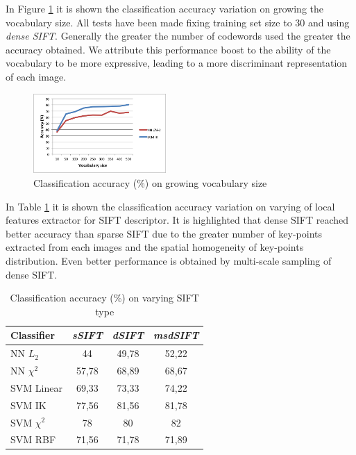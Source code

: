 In Figure \ref{fig:vocabulary} it is shown the classification accuracy variation on growing the vocabulary size. All tests have been made fixing training set size to 30 and using \emph{dense SIFT}. Generally the greater the number of codewords used the greater the accuracy obtained. We attribute this performance boost to the ability of the vocabulary to be more expressive, leading to a more discriminant representation of each image.

\begin{figure}[h]
\begin{center}
\includegraphics[width=0.45\textwidth]{images/vocabulary.png}
\end{center}
  \caption{Classification accuracy (\%) on growing vocabulary size}
\label{fig:vocabulary}
\end{figure}

In Table \ref{tab:sifttype} it is shown the classification accuracy variation on varying of local features extractor for SIFT descriptor. It is highlighted that dense SIFT reached better accuracy than sparse SIFT due to the greater number of key-points extracted from each images and the spatial homogeneity of key-points distribution. Even better performance is obtained by multi-scale sampling of dense SIFT. 

\begin{table}[h]
\begin{center}
\begin{tabular}{|l|c|c|c|}
\hline
Classifier & \emph{sSIFT} & \emph{dSIFT} & \emph{msdSIFT}\\
\hline\hline
NN $L_2$ & 44 & 49,78 & 52,22\\
NN $\chi^2$ & 57,78 & 68,89 & 68,67\\
SVM Linear & 69,33 & 73,33 & 74,22\\
SVM IK & 77,56 & 81,56 & 81,78\\
SVM $\chi^2$ & 78 & 80 & 82\\
SVM RBF & 71,56 & 71,78 & 71,89 \\
\hline
\end{tabular}
\end{center}
\label{tab:sifttype}
\caption{Classification accuracy (\%) on varying SIFT type}
\end{table}


